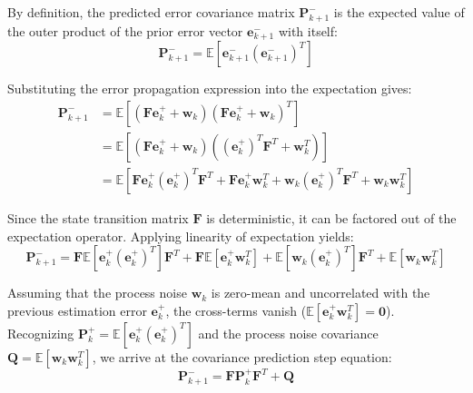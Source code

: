 \documentclass{article}
\begin{document}
	By definition, the predicted error covariance matrix $\mathbf{P}_{k+1}^-$ is the expected value of the outer product of the prior error vector $\mathbf{e}_{k+1}^-$ with itself:
	\[
	\mathbf{P}_{k+1}^- = \mathbb{E} \left[ \mathbf{e}_{k+1}^- (\mathbf{e}_{k+1}^-)^T \right]
	\]
	
	Substituting the error propagation expression into the expectation gives:
	\begin{align*}
		\mathbf{P}_{k+1}^- &= \mathbb{E} \left[ (\mathbf{F} \mathbf{e}_{k}^+ + \mathbf{w}_{k})(\mathbf{F} \mathbf{e}_{k}^+ + \mathbf{w}_{k})^T \right] \\
		&= \mathbb{E} \left[ (\mathbf{F} \mathbf{e}_{k}^+ + \mathbf{w}_{k})((\mathbf{e}_{k}^+)^T \mathbf{F}^T + \mathbf{w}_{k}^T) \right] \\
		&= \mathbb{E} \left[ \mathbf{F} \mathbf{e}_{k}^+ (\mathbf{e}_{k}^+)^T \mathbf{F}^T + \mathbf{F} \mathbf{e}_{k}^+ \mathbf{w}_{k}^T + \mathbf{w}_{k} (\mathbf{e}_{k}^+)^T \mathbf{F}^T + \mathbf{w}_{k} \mathbf{w}_{k}^T \right]
	\end{align*}
	
	Since the state transition matrix $\mathbf{F}$ is deterministic, it can be factored out of the expectation operator. Applying linearity of expectation yields:
	\[
	\mathbf{P}_{k+1}^- = \mathbf{F} \mathbb{E}\left[\mathbf{e}_{k}^+ (\mathbf{e}_{k}^+)^T\right] \mathbf{F}^T + \mathbf{F} \mathbb{E}\left[\mathbf{e}_{k}^+ \mathbf{w}_{k}^T\right] + \mathbb{E}\left[\mathbf{w}_{k} (\mathbf{e}_{k}^+)^T\right] \mathbf{F}^T + \mathbb{E}\left[\mathbf{w}_{k} \mathbf{w}_{k}^T\right]
	\]
	
	Assuming that the process noise $\mathbf{w}_{k}$ is zero-mean and uncorrelated with the previous estimation error $\mathbf{e}_{k}^+$, the cross-terms vanish ($\mathbb{E}\left[\mathbf{e}_{k}^+ \mathbf{w}_{k}^T\right] = \mathbf{0}$). Recognizing $\mathbf{P}_{k}^+ = \mathbb{E}\left[\mathbf{e}_{k}^+ (\mathbf{e}_{k}^+)^T\right]$ and the process noise covariance $\mathbf{Q} = \mathbb{E}\left[\mathbf{w}_{k} \mathbf{w}_{k}^T\right]$, we arrive at the covariance prediction step equation:
	\begin{equation}
		\mathbf{P}_{k+1}^- = \mathbf{F} \mathbf{P}_{k}^+ \mathbf{F}^T + \mathbf{Q}
		\label{eq:covariance_propagation}
	\end{equation}
	
\end{document}
